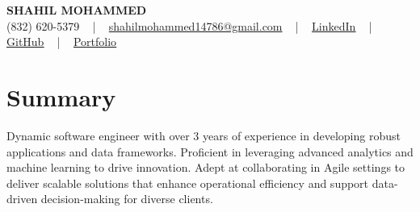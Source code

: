 \documentclass[letterpaper,10pt]{article}
\begin{document}
\begin{center}
    {\fontsize{14pt}{12pt}\selectfont \textbf{\MakeUppercase{Shahil Mohammed}}}\\ \vspace{2pt}
    \fontsize{10pt}{12pt}\selectfont (832) 620-5379 ~ | ~ \href{mailto:shahilmohammed14786@gmail.com}{shahilmohammed14786@gmail.com} ~ | ~  
    \href{https://www.linkedin.com/in/shahil-mohammed-9652931a1/}{\color{blue}\underline{LinkedIn}}  ~ | ~ 
    \href{https://github.com/freakbeast14}{\color{blue}\underline{GitHub}} ~ | ~ 
    \href{https://shahil-mohammed.netlify.app/}{\color{blue}\underline{Portfolio}}
    \vspace{-8pt}
\end{center}

\section{Summary}
\vspace{-2pt}\fontsize{8pt}{9pt}\selectfont
Dynamic software engineer with over 3 years of experience in developing robust applications and data frameworks. Proficient in leveraging advanced analytics and machine learning to drive innovation. Adept at collaborating in Agile settings to deliver scalable solutions that enhance operational efficiency and support data-driven decision-making for diverse clients.
 \vspace{-5pt}
 
\vspace{-2pt}
\end{document}
